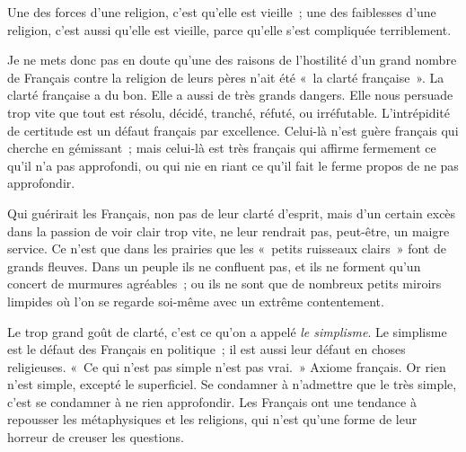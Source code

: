 \documentclass[french,twoside]{book} %
\newcommand{\astertri}{\medskip\par\centerline{\color{rubric}\large\selectfont{\syms ✻\,✻\,✻}}\medskip\par}%
\begin{document}
Une des forces d’une religion, c’est qu’elle est vieille ; une des faiblesses d’une religion, c’est aussi qu’elle est vieille, parce qu’elle s’est compliquée terriblement.\par
Je ne mets donc pas en doute qu’une des raisons de l’hostilité d’un grand nombre de Français contre la religion de leurs pères n’ait été « la clarté française ». La clarté française a du bon. Elle a aussi de très grands dangers. Elle nous persuade trop vite que tout est résolu, décidé, tranché, réfuté, ou irréfutable. L’intrépidité de certitude est un défaut français par excellence. Celui-là n’est guère français qui cherche en gémissant ; mais celui-là est très français qui affirme fermement ce qu’il n’a pas approfondi, ou qui nie en riant ce qu’il fait le ferme propos de ne pas approfondir.\par
Qui guérirait les Français, non pas de leur clarté  d’esprit, mais d’un certain excès dans la passion de voir clair trop vite, ne leur rendrait pas, peut-être, un maigre service. Ce n’est que dans les prairies que les « petits ruisseaux clairs » font de grands fleuves. Dans un peuple ils ne confluent pas, et ils ne forment qu’un concert de murmures agréables ; ou ils ne sont que de nombreux petits miroirs limpides où l’on se regarde soi-même avec un extrême contentement.\par
Le trop grand goût de clarté, c’est ce qu’on a appelé {\itshape le simplisme}. Le simplisme est le défaut des Français en politique ; il est aussi leur défaut en choses religieuses. « Ce qui n’est pas simple n’est pas vrai. » Axiome français. Or rien n’est simple, excepté le superficiel. Se condamner à n’admettre que le très simple, c’est se condamner à ne rien approfondir. Les Français ont une tendance à repousser les métaphysiques et les religions, qui n’est qu’une forme de leur horreur de creuser les questions.\par

\astertri
\end{document}
